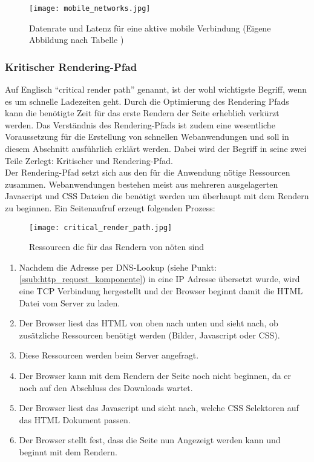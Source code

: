 	\begin{figure}[htbp]
		\begin{center}
			\texttt{[image: mobile\_networks.jpg]}
			\caption{Datenrate und Latenz für eine aktive mobile Verbindung (Eigene Abbildung nach Tabelle \autocite{grigorikGNetwork})}
			\label{fig:mobile_networks}
		\end{center}
	\end{figure}



	\subsubsection{Kritischer Rendering-Pfad} %
	\label{ssub:critical_render_path}
		Auf Englisch "`critical render path"' genannt, ist der wohl wichtigste Begriff, wenn es um schnelle Ladezeiten geht. Durch die Optimierung des Rendering Pfads kann die benötigte Zeit für das erste Rendern der Seite erheblich verkürzt werden. Das Verständnis des Rendering-Pfads ist zudem eine wesentliche Voraussetzung für die Erstellung von schnellen Webanwendungen und soll in diesem Abschnitt ausführlich erklärt werden. Dabei wird der Begriff in seine zwei Teile Zerlegt: Kritischer und Rendering-Pfad.\\

		Der Rendering-Pfad setzt sich aus den für die Anwendung nötige Ressourcen zusammen. Webanwendungen bestehen meist aus mehreren ausgelagerten Javascript und CSS Dateien die benötigt werden um überhaupt mit dem Rendern zu beginnen. Ein Seitenaufruf erzeugt folgenden Prozess:
		\begin{figure}[htbp]
			\begin{center}
				\texttt{[image: critical\_render\_path.jpg]}
				\caption{Ressourcen die für das Rendern von nöten sind}
				\label{fig:critical_render_path}
			\end{center}
		\end{figure}

		\begin{enumerate}
			\item Nachdem die Adresse per DNS-Lookup (siehe Punkt: \ref{ssub:http_request_komponente}) in eine IP Adresse übersetzt wurde, wird eine TCP Verbindung hergestellt und der Browser beginnt damit die HTML Datei vom Server zu laden.
			\item Der Browser liest das HTML von oben nach unten und sieht nach, ob zusätzliche Ressourcen benötigt werden (Bilder, Javascript oder CSS).
			\item Diese Ressourcen werden beim Server angefragt.
			\item Der Browser kann mit dem Rendern der Seite noch nicht beginnen, da er noch auf den Abschluss des Downloads wartet.
			\item Der Browser liest das Javascript und sieht nach, welche CSS Selektoren auf das HTML Dokument passen.
			\item Der Browser stellt fest, dass die Seite nun Angezeigt werden kann und beginnt mit dem Rendern.
		\end{enumerate}

